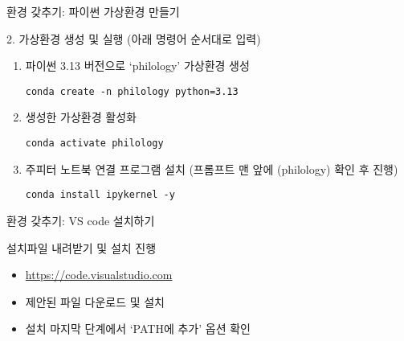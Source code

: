 \documentclass[11pt, aspectratio=169]{beamer}
\begin{document}
\begin{frame}[t, fragile]{환경 갖추기: 파이썬 가상환경 만들기}
  \begin{block}{2. 가상환경 생성 및 실행 (아래 명령어 순서대로 입력)}
        \begin{enumerate}
            \item 파이썬 3.13 버전으로 `philology' 가상환경 생성
            \begin{verbatim}
conda create -n philology python=3.13
            \end{verbatim}
            \item 생성한 가상환경 활성화
            \begin{verbatim}
conda activate philology
            \end{verbatim}
            \item 주피터 노트북 연결 프로그램 설치 (프롬프트 맨 앞에 (philology) 확인 후 진행)
            \begin{verbatim}
conda install ipykernel -y
            \end{verbatim}
        \end{enumerate}    
  \end{block}  
\end{frame}

\begin{frame}[t]{환경 갖추기: VS code 설치하기}
  \begin{block}{설치파일 내려받기 및 설치 진행}
    \begin{itemize}
      \item \url{https://code.visualstudio.com}
      \item 제안된 파일 다운로드 및 설치
      \item 설치 마지막 단계에서 `PATH에 추가' 옵션 확인
    \end{itemize}
  \end{block}
\end{frame}
\end{document}

